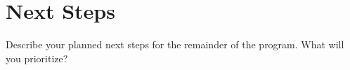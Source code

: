 \documentclass[midterm]{sparreport}
\begin{document}
\section{Next Steps}

Describe your planned next steps for the remainder of the program. What will you prioritize?

%



\end{document}
